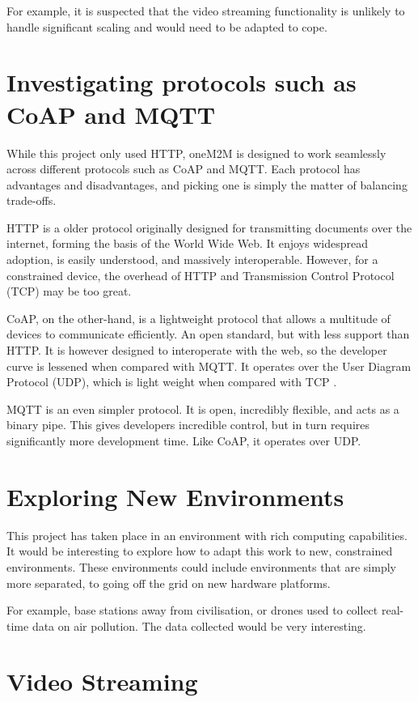 For example, it is suspected that the video streaming functionality is unlikely to handle significant scaling and would need to be adapted to cope.

\section{Investigating protocols such as CoAP and MQTT}

While this project only used HTTP, oneM2M is designed to work seamlessly across different protocols such as CoAP and MQTT. Each protocol has advantages and disadvantages, and picking one is simply the matter of balancing trade-offs.

HTTP is a older protocol originally designed for transmitting documents over the internet, forming the basis of the World Wide Web. It enjoys widespread adoption, is easily understood, and massively interoperable. However, for a constrained device, the overhead of HTTP and Transmission Control Protocol (TCP) may be too great.

CoAP, on the other-hand, is a lightweight protocol that allows a multitude of devices to communicate efficiently. An open standard, but with less support than HTTP. It is however designed to interoperate with the web, so the developer curve is lessened when compared with MQTT. It operates over the User Diagram Protocol (UDP), which is light weight when compared with TCP \cite{chen2014constrained}.

MQTT is an even simpler protocol. It is open, incredibly flexible, and acts as a binary pipe. This gives developers incredible control, but in turn requires significantly more development time. Like CoAP, it operates over UDP.

\section{Exploring New Environments}

This project has taken place in an environment with rich computing capabilities. It would be interesting to explore how to adapt this work to new, constrained environments. These environments could include environments that are simply more separated, to going off the grid on new hardware platforms.

For example, base stations away from civilisation, or drones used to collect real-time data on air pollution. The data collected would be very interesting.

\section{Video Streaming}

